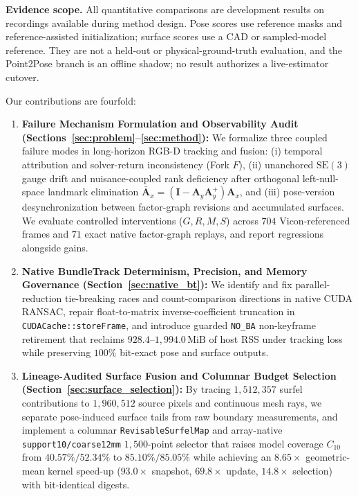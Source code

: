\documentclass[10pt,journal]{IEEEtran}
\begin{document}
\textbf{Evidence scope.} All quantitative comparisons are development results on recordings available during method design. Pose scores use reference masks and reference-assisted initialization; surface scores use a CAD or sampled-model reference. They are not a held-out or physical-ground-truth evaluation, and the Point2Pose branch is an offline shadow; no result authorizes a live-estimator cutover.

Our contributions are fourfold:
\begin{enumerate}
    \item \textbf{Failure Mechanism Formulation and Observability Audit (Sections~\ref{sec:problem}--\ref{sec:method}):} We formalize three coupled failure modes in long-horizon RGB-D tracking and fusion: (i) temporal attribution and solver-return inconsistency (Fork $F$), (ii) unanchored $\mathrm{SE}(3)$ gauge drift and nuisance-coupled rank deficiency after orthogonal left-null-space landmark elimination $\bar{\mathbf{A}}_x=(\mathbf{I}-\mathbf{A}_y\mathbf{A}_y^+)\mathbf{A}_x$, and (iii) pose-version desynchronization between factor-graph revisions and accumulated surfaces. We evaluate controlled interventions ($G,R,M,S$) across $704$ Vicon-referenced frames and $71$ exact native factor-graph replays, and report regressions alongside gains.
    \item \textbf{Native BundleTrack Determinism, Precision, and Memory Governance (Section~\ref{sec:native_bt}):} We identify and fix parallel-reduction tie-breaking races and count-comparison directions in native CUDA RANSAC, repair float-to-matrix inverse-coefficient truncation in \texttt{CUDACache::storeFrame}, and introduce guarded \texttt{NO\_BA} non-keyframe retirement that reclaims $928.4$--$1{,}994.0\,\mathrm{MiB}$ of host RSS under tracking loss while preserving $100\%$ bit-exact pose and surface outputs.
    \item \textbf{Lineage-Audited Surface Fusion and Columnar Budget Selection (Section~\ref{sec:surface_selection}):} By tracing $1{,}512{,}357$ surfel contributions to $1{,}960{,}512$ source pixels and continuous mesh rays, we separate pose-induced surface tails from raw boundary measurements, and implement a columnar \texttt{RevisableSurfelMap} and array-native \texttt{support10/coarse12mm} $1{,}500$-point selector that raises model coverage $C_{10}$ from $40.57\%/52.34\%$ to $85.10\%/85.05\%$ while achieving an $8.65\times$ geometric-mean kernel speed-up ($93.0\times$ snapshot, $69.8\times$ update, $14.8\times$ selection) with bit-identical digests.

\end{enumerate}
\end{document}
